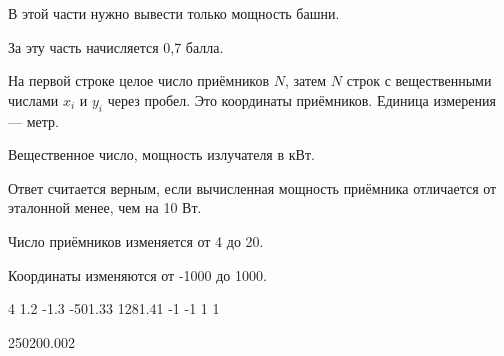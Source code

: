 В этой части нужно вывести только мощность башни.

За эту часть начисляется 0,7 балла.


На первой строке целое число приёмников $N$, затем $N$ строк с вещественными 
числами $x_i$ и $y_i$ через пробел. Это координаты приёмников. Единица измерения — метр.

\outputfmtSection

Вещественное число, мощность излучателя в кВт.

Ответ считается верным, если вычисленная мощность приёмника отличается от эталонной менее, чем на 10 Вт.

Число приёмников изменяется от 4 до 20.

Координаты изменяются от -1000 до 1000.

\begin{myverbbox}[\small]{\vinput}
    4
    1.2 -1.3
    -501.33 1281.41
    -1 -1
    1 1
\end{myverbbox}
\begin{myverbbox}[\small]{\voutput}
    250200.002
\end{myverbbox}

